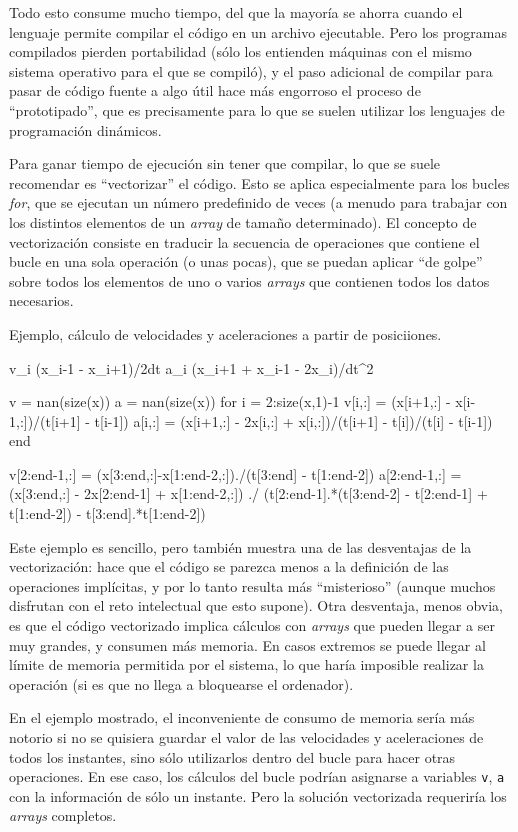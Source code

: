 ﻿\documentclass[spanish]{article}
\begin{document}
Todo esto consume mucho tiempo, del que la mayoría se ahorra cuando el lenguaje
permite compilar el código en un archivo ejecutable. Pero los programas
compilados pierden portabilidad (sólo los entienden máquinas con el
mismo sistema operativo para el que se compiló), y el paso adicional
de compilar para pasar de código fuente a algo útil hace más engorroso
el proceso de ``prototipado'', que es precisamente para lo que se suelen
utilizar los lenguajes de programación dinámicos.

Para ganar tiempo de ejecución sin tener que compilar, lo que se suele
recomendar es ``vectorizar'' el código. Esto se aplica especialmente para
los bucles \emph{for}, que se ejecutan un número predefinido de veces
(a menudo para trabajar con los distintos elementos de un \emph{array}
de tamaño determinado). El concepto de vectorización consiste en
traducir la secuencia de operaciones que contiene el bucle en una sola
operación (o unas pocas), que se puedan aplicar ``de golpe'' sobre todos los 
elementos de uno o varios \emph{arrays} que contienen todos los datos
necesarios.

Ejemplo, cálculo de velocidades y aceleraciones a partir de posiciiones.

v_i \approx (x_{i-1} - x_{i+1})/2dt
a_i \approx (x_i+1 + x_i-1 - 2x_i)/dt^2


v = nan(size(x))
a = nan(size(x))
for i = 2:size(x,1)-1
  v[i,:] = (x[i+1,:] - x[i-1,:])/(t[i+1] - t[i-1])
  a[i,:] = (x[i+1,:] - 2x[i,:] + x[i,:])/(t[i+1] - t[i])/(t[i] - t[i-1])
end

v[2:end-1,:] = (x[3:end,:]-x[1:end-2,:])./(t[3:end] - t[1:end-2])
a[2:end-1,:] = (x[3:end,:] - 2x[2:end-1] + x[1:end-2,:]) ./
  (t[2:end-1].*(t[3:end-2] - t[2:end-1] + t[1:end-2]) - t[3:end].*t[1:end-2])

Este ejemplo es sencillo, pero también muestra una de las desventajas de
la vectorización: hace que el código se parezca menos a la definición
de las operaciones implícitas, y por lo tanto resulta más ``misterioso''
(aunque muchos disfrutan con el reto intelectual que esto supone).
Otra desventaja, menos obvia, es que el código vectorizado implica
cálculos con \emph{arrays} que pueden llegar a ser muy grandes, y
consumen más memoria. En casos extremos se puede llegar al límite
de memoria permitida por el sistema, lo que haría imposible
realizar la operación (si es que no llega a bloquearse el ordenador).

En el ejemplo mostrado, el inconveniente de consumo de memoria sería
más notorio si no se quisiera guardar el valor de las velocidades y
aceleraciones de todos los instantes, sino sólo utilizarlos dentro
del bucle para hacer otras operaciones. En ese caso, los cálculos del bucle
podrían asignarse a variables \texttt{v}, \texttt{a} con la información de sólo
un instante. Pero la solución vectorizada requeriría los \emph{arrays}
completos.
\end{document}
